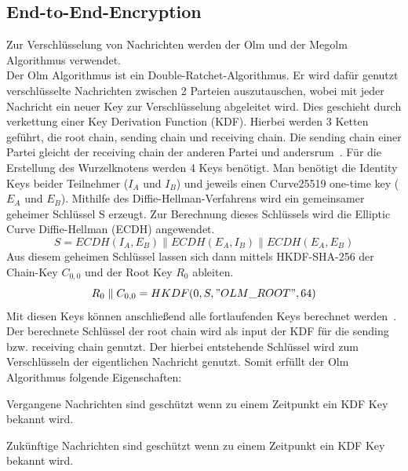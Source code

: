     \subsection{End-to-End-Encryption}\label{subsec:verwendete-schlussel}
    Zur Verschlüsselung von Nachrichten werden der Olm und der Megolm Algorithmus verwendet.\\
    Der Olm Algorithmus ist ein Double-Ratchet-Algorithmus.
    Er wird dafür genutzt verschlüsselte Nachrichten zwischen 2 Parteien auszutauschen, wobei mit jeder Nachricht ein neuer Key zur Verschlüsselung abgeleitet wird.
    Dies geschieht durch verkettung einer Key Derivation Function (KDF).
    Hierbei werden 3 Ketten geführt, die root chain, sending chain und receiving chain.
    Die sending chain einer Partei gleicht der receiving chain der anderen Partei und andersrum~\cite{perrin2016double}.
    Für die Erstellung des Wurzelknotens werden 4 Keys benötigt.
    Man benötigt die Identity Keys beider Teilnehmer ($I_A$ und $I_B$) und jeweils einen Curve25519 one-time key ($E_A$ und $E_B$).
    Mithilfe des Diffie-Hellman-Verfahrens wird ein gemeinsamer geheimer Schlüssel S erzeugt.
    Zur Berechnung dieses Schlüssels wird die Elliptic Curve Diffie-Hellman (ECDH) angewendet.
    \begin{displaymath}
        S = ECDH(I_A,E_B)\parallel ECDH(E_A,I_B) \parallel ECDH(E_A,E_B)
    \end{displaymath}
    Aus diesem geheimen Schlüssel lassen sich dann mittels HKDF-SHA-256 der Chain-Key $C_{0,0}$ und der Root Key $R_0$ ableiten.
    \begin{displaymath}
        R_0 \parallel C_{0,0} = HKDF(0,S,"OLM\_ROOT",64)
    \end{displaymath}
    Mit diesen Keys können anschließend alle fortlaufenden Keys berechnet werden~\cite{olm}.
    Der berechnete Schlüssel der root chain wird als input der KDF für die sending bzw. receiving chain genutzt.
    Der hierbei entstehende Schlüssel wird zum Verschlüsseln der eigentlichen Nachricht genutzt.
    Somit erfüllt der Olm Algorithmus folgende Eigenschaften:
    \begin{description}[leftmargin=!,labelwidth=3cm]
        \item [Resilience]
        \item [Forward security] Vergangene Nachrichten sind geschützt wenn zu einem Zeitpunkt ein KDF Key bekannt wird.
        \item [Break-in recovery] Zukünftige Nachrichten sind geschützt wenn zu einem Zeitpunkt ein KDF Key bekannt wird.
    \end{description}

